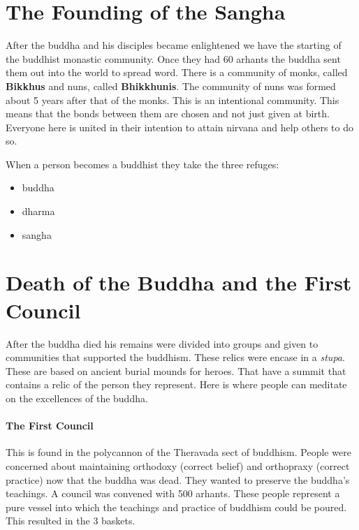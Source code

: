 \documentclass{article}
\begin{document}
\section*{The Founding of the Sangha}
\label{sec:the_founding_of_the_sangha}
After the buddha and his disciples became enlightened we have the starting of the buddhist monastic community. Once they had 60 arhants the buddha sent them out into the world to spread word. There is a community of monks, called \textbf{Bikkhus} and nuns, called \textbf{Bhikkhunis}. The community of nuns was formed about 5 years after that of the monks. This is an intentional community. This means that the bonds between them are chosen and not just given at birth. Everyone here is united in their intention to attain nirvana and help others to do so.

When a person becomes a buddhist they take the three refuges:
\begin{itemize}
	\item buddha
	\item dharma
	\item sangha
\end{itemize}

\section*{Death of the Buddha and the First Council}
\label{sec:death_of_the_buddha_and_the_first_council}
After the buddha died his remains were divided into groups and given to communities that supported the buddhism. These relics were encase in a \emph{stupa}. These are based on ancient burial mounds for heroes. That have a summit that contains a relic of the person they represent. Here is where people can meditate on the excellences of the buddha.

\paragraph{The First Council}
\label{par:the_first_council}
This is found in the polycannon of the Theravada sect of buddhism. People were concerned about maintaining orthodoxy (correct belief) and orthopraxy (correct practice) now that the buddha was dead. They wanted to preserve the buddha's teachings. A council was convened with 500 arhants. These people represent a pure vessel into which the teachings and practice of buddhism could be poured. This resulted in the 3 baskets.
\end{document}
